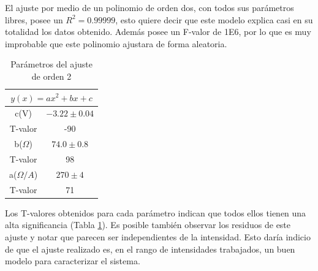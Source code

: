 \documentclass[twoside,twocolumn,a4paper]{article}
\begin{document}

El ajuste por medio de un polinomio de orden dos, con todos sus par\'ametros libres, posee un $R^2=0.99999$, esto quiere decir que este modelo explica casi en su totalidad los datos obtenido. Adem\'as posee un F-valor de 1E6, por lo que es muy improbable que este polinomio ajustara de forma aleatoria.\par

\begin{table}[h!]
\centering
\caption{Par\'ametros del ajuste de orden 2}
\label{tab:o2}
\begin{tabular}{|c|c|}
\hline
\multicolumn{2}{|c|}{$y(x)=ax^2+bx+c$} \\ \hline
c(V)           & $-3.22\pm0.04$        \\ \hline
T-valor        & -90                   \\ \hline
b($\Omega$)     & $74.0\pm0.8$          \\ \hline
T-valor        & 98                    \\ \hline
a($\Omega/A$)  & $270\pm4$             \\ \hline
T-valor        & 71                    \\ \hline
\end{tabular}
\end{table}


Los T-valores obtenidos para cada par\'ametro indican que todos ellos tienen una alta significancia (Tabla \ref{tab:o2}). Es posible tambi\'en observar los residuos de este ajuste y notar que parecen ser independientes de la intensidad. Esto dar\'ia indicio de que el ajuste realizado es, en el rango de intensidades trabajados, un buen modelo para caracterizar el sistema.\par
\end{document}
